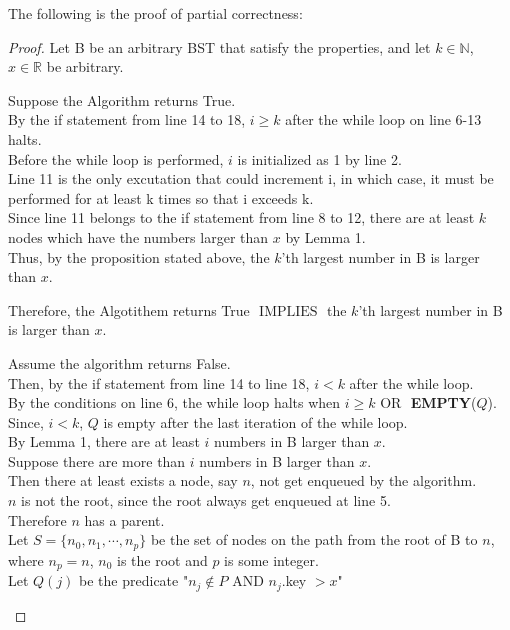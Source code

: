 \documentclass[10pt]{article}
\newcommand{\iimplies}{\mbox{ IMPLIES }}
\newcommand{\oor}{\mbox{ OR }}
\newcommand{\aand}{\mbox{ AND }}
\begin{document}
\begin{enumerate}
The following is the proof of partial correctness:
\begin{proof}
    Let B be an arbitrary BST that satisfy the properties, and let $k \in \mathbb{N}$, $x \in \mathbb{R}$ be arbitrary. 
\begin{addmargin}[1em]{0em}
  Suppose the Algorithm returns True. \\
  By the if statement from line 14 to 18, $i \geq k$ after the while loop on line 6-13 halts. \\
  Before the while loop is performed, $i$ is initialized as 1 by line 2. \\
  Line 11 is the only excutation that could increment i, in which case, it must be performed for at least k times so that i exceeds k. \\
  Since line 11 belongs to the if statement from line 8 to 12, there are at least $k$ nodes which have the numbers larger than $x$ by Lemma 1. \\
  Thus, by the proposition stated above, the $k$'th largest number in B is larger than $x$. 
\end{addmargin}

Therefore, the Algotithem returns True $\iimplies$ the $k$'th largest number in B is larger than $x$. 

\begin{addmargin}[1em]{0em}
  Assume the algorithm returns False. \\
  Then, by the if statement from line 14 to line 18, $i < k$ after the while loop. \\
  By the conditions on line 6, the while loop halts when $i \geq k \oor$ \textbf{EMPTY}($Q$). \\
  Since, $i < k$, $Q$ is empty after the last iteration of the while loop. \\
  By Lemma 1, there are at least $i$ numbers in B larger than $x$. \\
  Suppose there are more than $i$ numbers in B larger than $x$. \\
  Then there at least exists a node, say $n$, not get enqueued by the algorithm. \\
  $n$ is not the root, since the root always get enqueued at line 5. \\
  Therefore $n$ has a parent. \\
  Let $S = \{n_0, n_1, \cdots, n_p\}$ be the set of nodes on the path from the root of B to $n$, where $n_p = n$, $n_0$ is the root and $p$ is some integer. \\
  Let $Q(j)$ be the predicate "$n_j \notin P \aand n_j$.key $> x$" 


\end{addmargin}
\end{proof}
\end{enumerate}
\end{document}
